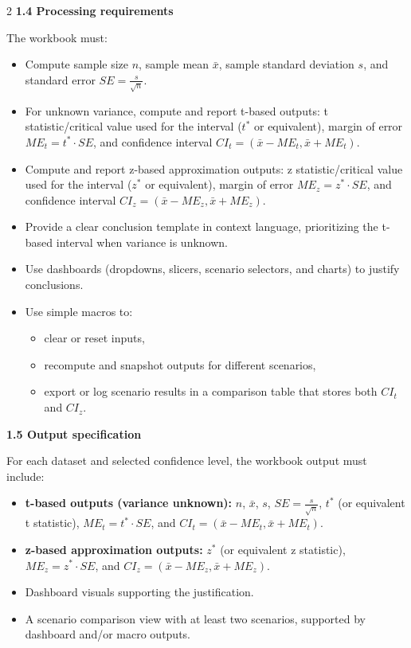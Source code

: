 \documentclass[12pt]{article}
\begin{document}
\begin{multicols}{2}
		\textbf{1.4 Processing requirements}\par
		The workbook must:
		\begin{itemize}
			\item Compute sample size $n$, sample mean $\bar{x}$, sample standard deviation $s$, and standard error $SE=\frac{s}{\sqrt{n}}$.
			\item For unknown variance, compute and report t-based outputs: t statistic/critical value used for the interval ($t^*$ or equivalent), margin of error $ME_t=t^*\cdot SE$, and confidence interval $CI_t=(\bar{x}-ME_t,\bar{x}+ME_t)$.
			\item Compute and report z-based approximation outputs: z statistic/critical value used for the interval ($z^*$ or equivalent), margin of error $ME_z=z^*\cdot SE$, and confidence interval $CI_z=(\bar{x}-ME_z,\bar{x}+ME_z)$.
			\item Provide a clear conclusion template in context language, prioritizing the t-based interval when variance is unknown.
			\item Use dashboards (dropdowns, slicers, scenario selectors, and charts) to justify conclusions.
			\item Use simple macros to:
			\begin{itemize}
				\item clear or reset inputs,
				\item recompute and snapshot outputs for different scenarios,
				\item export or log scenario results in a comparison table that stores both $CI_t$ and $CI_z$.
			\end{itemize}
		\end{itemize}
		
		\textbf{1.5 Output specification}\par
		For each dataset and selected confidence level, the workbook output must include:
		\begin{itemize}
			\item \textbf{t-based outputs (variance unknown):} $n$, $\bar{x}$, $s$, $SE=\frac{s}{\sqrt{n}}$, $t^*$ (or equivalent t statistic), $ME_t=t^*\cdot SE$, and $CI_t=(\bar{x}-ME_t,\bar{x}+ME_t)$.
			\item \textbf{z-based approximation outputs:} $z^*$ (or equivalent z statistic), $ME_z=z^*\cdot SE$, and $CI_z=(\bar{x}-ME_z,\bar{x}+ME_z)$.
			\item Dashboard visuals supporting the justification.
			\item A scenario comparison view with at least two scenarios, supported by dashboard and/or macro outputs.
		\end{itemize}
		

\end{multicols}
\end{document}
